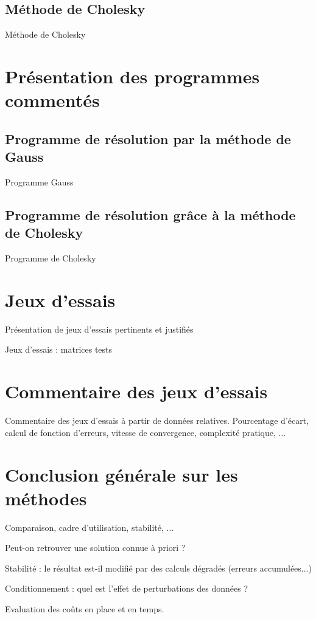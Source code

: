 \documentclass{article}
\begin{document}
\subsection{Méthode de Cholesky}

Méthode de Cholesky

\section{Présentation des programmes commentés}

\subsection{Programme de résolution par la méthode de Gauss}

\begin{boxedverbatim}
 Programme Gauss
\end{boxedverbatim}

\subsection{Programme de résolution grâce à la méthode de Cholesky}

\begin{boxedverbatim}
 Programme de Cholesky
\end{boxedverbatim}

\section{Jeux d'essais}

Présentation de jeux d'essais pertinents et justifiés

Jeux d'essais : matrices tests

\section{Commentaire des jeux d'essais}

Commentaire des jeux d'essais à partir de données relatives.
Pourcentage d'écart, calcul de fonction d'erreurs, vitesse de convergence, complexité pratique, ...

\section{Conclusion générale sur les méthodes}

Comparaison, cadre d'utilisation, stabilité, ...

Peut-on retrouver une solution connue à priori ?

Stabilité : le résultat est-il modifié par des calculs dégradés (erreurs accumulées...)

Conditionnement : quel est l'effet de perturbations des données ?

Evaluation des coûts en place et en temps.
\end{document}
